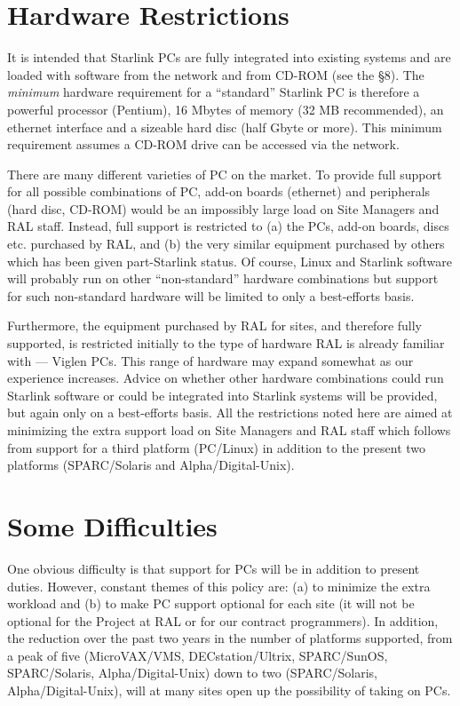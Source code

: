 \documentclass[twoside,11pt]{article}
\begin{document}
\section{Hardware Restrictions}

It is intended that Starlink PCs are fully integrated into existing
systems and are loaded with software from the network and from CD-ROM
(see the \S 8).  The {\em minimum} hardware requirement for a
``standard'' Starlink PC is therefore a powerful processor (Pentium),
16 Mbytes of memory (32 MB recommended), an ethernet interface and a sizeable hard disc
(half Gbyte or more).  This minimum requirement assumes a CD-ROM drive
can be accessed via the network.

There are many different varieties of PC on the market.  To provide
full support for all possible combinations of PC, add-on boards
(ethernet) and peripherals (hard disc, CD-ROM) would be an impossibly
large load on Site Managers and RAL staff.  Instead,
full support is restricted to  (a) the PCs, add-on boards, discs etc.
purchased by RAL, and (b) the very similar equipment purchased by
others which has been given part-Starlink status.  Of course, Linux and
Starlink software will probably run on other ``non-standard'' hardware
combinations but support for such non-standard hardware will be limited
to only a best-efforts basis.

Furthermore, the equipment purchased by RAL for sites, and
therefore fully supported, is restricted initially to the type of
hardware RAL is already familiar with --- Viglen PCs.
This range of hardware may expand somewhat as our experience
increases.  Advice on whether other hardware combinations could run
Starlink software or could be integrated into Starlink systems will be
provided, but again only on a best-efforts basis.  All the
restrictions noted here are aimed at minimizing the extra support load on
Site Managers and RAL staff which follows from support for a third
platform (PC/Linux) in addition to the present two platforms
(SPARC/Solaris and Alpha/Digital-Unix).

\section{Some Difficulties}

One obvious difficulty is that support for PCs will be in addition to
present duties.  However, constant themes of this policy are: (a) to
minimize the extra workload and (b) to make PC support optional for
each site (it will not be optional for the Project at RAL or for our
contract programmers).  In addition,  the reduction over the past two
years in the number of platforms supported, from a peak of five
(MicroVAX/VMS, DECstation/Ultrix, SPARC/SunOS, SPARC/Solaris,
Alpha/Digital-Unix) down to two (SPARC/Solaris, Alpha/Digital-Unix),
will at many sites open up the possibility of taking on PCs.
\end{document}
